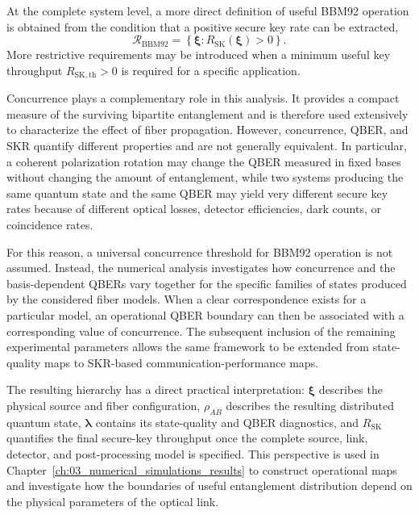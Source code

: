 At the complete system level, a more direct definition of useful BBM92 operation is obtained from the condition that a positive secure key rate can be extracted,
\begin{equation}
\boxed{
\mathcal{R}_{\mathrm{BBM92}}
=
\left\{
\boldsymbol{\xi}
:
R_{\mathrm{SK}}(\boldsymbol{\xi})>0
\right\}.
}
\label{eq:bbm92_operating_region}
\end{equation}
More restrictive requirements may be introduced when a minimum useful key throughput \(R_{\mathrm{SK,th}}>0\) is required for a specific application.

Concurrence plays a complementary role in this analysis. It provides a compact measure of the surviving bipartite entanglement and is therefore used extensively to characterize the effect of fiber propagation. However, concurrence, QBER, and SKR quantify different properties and are not generally equivalent. In particular, a coherent polarization rotation may change the QBER measured in fixed bases without changing the amount of entanglement, while two systems producing the same quantum state and the same QBER may yield very different secure key rates because of different optical losses, detector efficiencies, dark counts, or coincidence rates.

For this reason, a universal concurrence threshold for BBM92 operation is not assumed. Instead, the numerical analysis investigates how concurrence and the basis-dependent QBERs vary together for the specific families of states produced by the considered fiber models. When a clear correspondence exists for a particular model, an operational QBER boundary can then be associated with a corresponding value of concurrence. The subsequent inclusion of the remaining experimental parameters allows the same framework to be extended from state-quality maps to SKR-based communication-performance maps.

The resulting hierarchy has a direct practical interpretation: \(\boldsymbol{\xi}\) describes the physical source and fiber configuration, \(\rho_{AB}\) describes the resulting distributed quantum state, \(\boldsymbol{\lambda}\) contains its state-quality and QBER diagnostics, and \(R_{\mathrm{SK}}\) quantifies the final secure-key throughput once the complete source, link, detector, and post-processing model is specified. This perspective is used in Chapter~\ref{ch:03_numerical_simulations_results} to construct operational maps and investigate how the boundaries of useful entanglement distribution depend on the physical parameters of the optical link.

